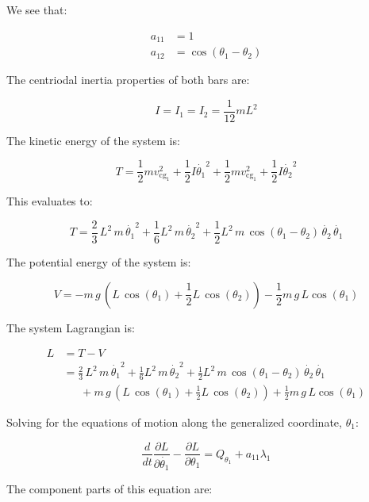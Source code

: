 \documentclass[12pt, letterpaper]{../assignment}
\begin{document}
We see that:

\begin{equation*}
    \begin{aligned}
        a_{11} &= 1 \\
        a_{12} &= \cos \left(\theta_1 -\theta_2 \right)
    \end{aligned}
\end{equation*}


The centriodal inertia properties of both bars are:

$$ I = I_1  = I_2 = \frac{1}{12} m L^2 $$

The kinetic energy of the system is:

$$ T =  \frac{1}{2} m v_{\text{cg}_1}^2 +
    \frac{1}{2}I \dot{\theta_1}^2 +
    \frac{1}{2} m v_{\text{cg}_1}^2 +
    \frac{1}{2} I \dot{\theta_2}^2 $$

This evaluates to:

$$ T = \frac{2}{3}\,L^2 \,m\,{{\dot{\theta_1}}}^2+
\frac{1}{6}L^2 \,m\,{{\dot{\theta_2}}}^2+
\frac{1}{2}L^2 \,m\,\cos \left(\theta_1 -\theta_2 \right)\,\dot{\theta_2} \,\dot{\theta_1}  $$

The potential energy of the system is:

$$ V = -m\,g\,{\left(L\,\cos \left(\theta_1 \right)+\frac{1}{2}L\,\cos \left(\theta_2 \right)\right)}-\frac{1}{2}m\,g\,L\cos \left(\theta_1 \right) $$

The system Lagrangian is:

\begin{equation*}
    \begin{aligned}
L &= T - V\\
 &= \frac{2}{3}\,L^2 \,m\,{{\dot{\theta_1}}}^2+
\frac{1}{6}L^2 \,m\,{{\dot{\theta_2}}}^2+
\frac{1}{2}L^2 \,m\,\cos \left(\theta_1 -\theta_2 \right)\,\dot{\theta_2} \,\dot{\theta_1} \\
& \ \ \ \ \ \ \ + m\,g\,{\left(L\,\cos \left(\theta_1 \right)+\frac{1}{2}L\,\cos \left(\theta_2 \right)\right)}+\frac{1}{2}m\,g\,L\cos \left(\theta_1 \right)
\end{aligned}
\end{equation*}

Solving for the equations of motion along the generalized coordinate, $\theta_1$:

$$ \frac{d}{d t} \frac{\partial L}{\partial \dot{\theta_1}} - \frac{\partial L}{\partial \theta_1} = 
Q_{\theta_1} + a_{11} \lambda_1 $$

The component parts of this equation are:
\end{document}
